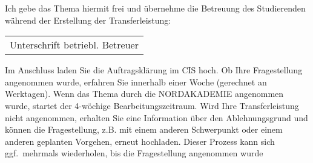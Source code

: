 \documentclass[12pt]{article}
\begin{document}
\vspace{1.5em}


\vspace{1.5em}


\vspace{1.5em}


\newpage

\vspace*{1.5em}

Ich gebe das Thema hiermit frei und übernehme die Betreuung des Studierenden während
der Erstellung der Transferleistung:

\vspace{1.5em}

\renewcommand{\arraystretch}{1.5} %

\begin{tabularx}{.4\textwidth}{X}
    \\
    \hline
    Unterschrift betriebl. Betreuer \\
\end{tabularx}

\vspace{3em}

Im Anschluss laden Sie die
Auftragsklärung im CIS hoch. Ob Ihre Fragestellung angenommen wurde, erfahren Sie innerhalb einer Woche (gerechnet an Werktagen). Wenn das Thema durch die NORDAKADEMIE angenommen wurde, startet der 4-wöchige
Bearbeitungszeitraum. Wird Ihre Transferleistung nicht angenommen, erhalten Sie eine
Information über den Ablehnungsgrund und können die Fragestellung, z.B. mit einem
anderen Schwerpunkt oder einem anderen geplanten Vorgehen, erneut hochladen.
Dieser Prozess kann sich ggf.\ mehrmals wiederholen, bis die Fragestellung angenommen
wurde
\end{document}
